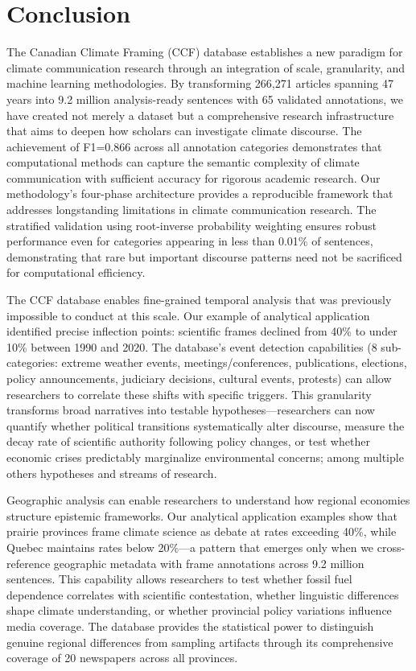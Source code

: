 \documentclass[12pt]{article}
\begin{document}
\newpage
\section{Conclusion}

The Canadian Climate Framing (CCF) database establishes a new paradigm for climate communication research through an integration of scale, granularity, and machine learning methodologies. By transforming 266,271 articles spanning 47 years into 9.2 million analysis-ready sentences with 65 validated annotations, we have created not merely a dataset but a comprehensive research infrastructure that aims to deepen how scholars can investigate climate discourse. The achievement of F1=0.866 across all annotation categories demonstrates that computational methods can capture the semantic complexity of climate communication with sufficient accuracy for rigorous academic research. Our methodology's four-phase architecture provides a reproducible framework that addresses longstanding limitations in climate communication research. The stratified validation using root-inverse probability weighting ensures robust performance even for categories appearing in less than 0.01\% of sentences, demonstrating that rare but important discourse patterns need not be sacrificed for computational efficiency.

The CCF database enables fine-grained temporal analysis that was previously impossible to conduct at this scale. Our example of analytical application identified precise inflection points: scientific frames declined from 40\% to under 10\% between 1990 and 2020. The database's event detection capabilities (8 sub-categories: extreme weather events, meetings/conferences, publications, elections, policy announcements, judiciary decisions, cultural events, protests) can allow researchers to correlate these shifts with specific triggers. This granularity transforms broad narratives into testable hypotheses—researchers can now quantify whether political transitions systematically alter discourse, measure the decay rate of scientific authority following policy changes, or test whether economic crises predictably marginalize environmental concerns; among multiple others hypotheses and streams of research.

Geographic analysis can enable researchers to understand how regional economies structure epistemic frameworks. Our analytical application examples show that prairie provinces frame climate science as debate at rates exceeding 40\%, while Quebec maintains rates below 20\%—a pattern that emerges only when we cross-reference geographic metadata with frame annotations across 9.2 million sentences. This capability allows researchers to test whether fossil fuel dependence correlates with scientific contestation, whether linguistic differences shape climate understanding, or whether provincial policy variations influence media coverage. The database provides the statistical power to distinguish genuine regional differences from sampling artifacts through its comprehensive coverage of 20 newspapers across all provinces.
\end{document}
